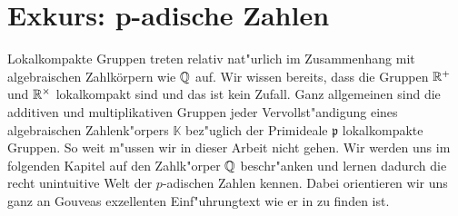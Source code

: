 \section{Exkurs: p-adische Zahlen}\label{sec:padisch}
	Lokalkompakte Gruppen treten relativ nat"urlich im Zusammenhang mit algebraischen Zahlkörpern wie $\mathbb{Q}$ auf.
	Wir wissen bereits, dass die Gruppen $\mathbb{R}^+$ und $\mathbb{R}^\times$ lokalkompakt sind und das ist kein Zufall.
	Ganz allgemeinen sind die additiven und multiplikativen Gruppen jeder Vervollst"andigung eines algebraischen Zahlenk"orpers $\mathbb{K}$ bez"uglich der Primideale $\mathfrak{p}$ lokalkompakte Gruppen.
	So weit m"ussen wir in dieser Arbeit nicht gehen. 
	Wir werden uns im folgenden Kapitel auf den Zahlk"orper $\mathbb{Q}$ beschr"anken und lernen dadurch die recht unintuitive Welt der $p$-adischen Zahlen kennen.
	Dabei orientieren wir uns ganz an Gouveas exzellenten Einf"uhrungtext wie er in \cite{gouv} zu finden ist.
